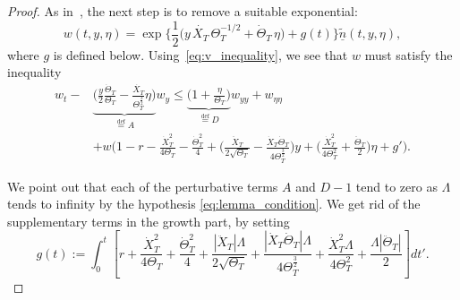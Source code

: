 \documentclass[11pt]{article}    %
\newcommand{\eps}{\varepsilon}
\begin{document}
\begin{proof}
%
As in~\cite{BHR_Acceleration}, the next step is to remove a suitable exponential:
\[
w(t,y,\eta) = \exp\Big\{ \frac12\big(y\,\dot{X_T}\, \Theta_T^{-1/2} + \dot\Theta_T\, \eta \big) + g(t)\Big\} \underline{\tilde n}(t,y,\eta),
\]
where $g$ is defined below. Using~\eqref{eq:v_inequality}, we see that $w$ must satisfy the inequality
\begin{equation}\begin{split}
	w_t - &\underbrace{\Big(\frac{y}{2}\frac{\dot\Theta_T}{\Theta_T} - \frac{\dot{X_T}}{\Theta_T^{\frac32}}\eta\Big)}_{\stackrel{\text{def}}{=} A} w_y
		\leq \underbrace{\Big(1 + \frac{\eta}{\Theta_T}\Big)}_{\stackrel{\text{def}}{=} D} w_{yy} + w_{\eta\eta}\\
			& + w\Big( 1 - r - \frac{\dot{X}_T^2}{4\Theta_T} - \frac{\dot{\Theta}_T^2}{4} + 
			\Big( \frac{\ddot{X}_T}{2\sqrt{\Theta_T}} - \frac{\dot{X}_T\dot{\Theta}_T}{4\Theta_T^{\frac32}} \Big) y 
			+ \Big( \frac{\dot{X}_T^2}{4\Theta_T^2} + \frac{\ddot{\Theta}_T}{2} \Big) \eta + g' \Big).
\end{split}
\label{eq:trajectories}
\end{equation}

We point out that each of the perturbative terms $A$ and $D - 1$ tend to zero as $\Lambda$ tends to infinity by the hypothesis \eqref{eq:lemma_condition}. We get rid of the supplementary terms in the growth part, by setting
\begin{equation*}
g(t) := \int_0^{t} \left[r + \frac{\dot{X}_{T}^2}{4\Theta_{T}} + \frac{\dot{\Theta}_{T}^2}{4} + 
			\frac{|\ddot{X}_{T}|\Lambda}{2 \sqrt{\Theta_T}} + \frac{|\dot{X}_{T}\dot{\Theta}_{T}|\Lambda}{4\Theta_{T}^{\frac32}}  
			+ \frac{\dot{X}_{T}^2 \Lambda}{4\Theta_{T}^2} + \frac{\Lambda|\ddot{\Theta}_{T}|}{2} \right] dt'.
\end{equation*}

%


\end{proof}
\end{document}
